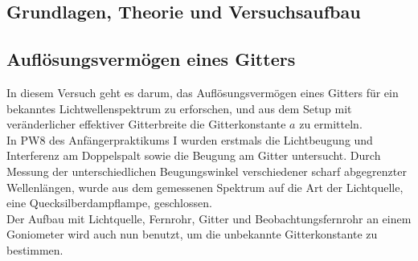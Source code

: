 \documentclass[12pt,a4paper]{article}
\begin{document}
\begin{multicols}{2}




%			



\section{Grundlagen, Theorie und Versuchsaufbau}

\subsection{Auflösungsvermögen eines Gitters}

In diesem Versuch geht es darum, das Auflösungsvermögen eines Gitters für ein bekanntes Lichtwellenspektrum zu erforschen, und aus dem Setup mit veränderlicher effektiver Gitterbreite die Gitterkonstante $a$ zu ermitteln.\\
In PW8 des Anfängerpraktikums I wurden erstmals die Lichtbeugung und Interferenz am Doppelspalt sowie die Beugung am Gitter untersucht. Durch Messung der unterschiedlichen Beugungswinkel verschiedener scharf abgegrenzter Wellenlängen, wurde aus dem gemessenen Spektrum auf die Art der Lichtquelle, eine Quecksilberdampflampe, geschlossen.\\
Der Aufbau mit Lichtquelle, Fernrohr, Gitter und Beobachtungsfernrohr an einem Goniometer wird auch nun benutzt, um die unbekannte Gitterkonstante zu bestimmen.\\



\end{multicols}
\end{document}

